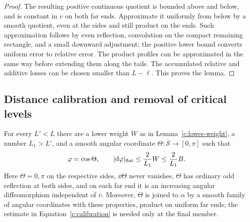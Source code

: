 \begin{proof}
The resulting positive continuous quotient is bounded above and below,
and is constant in $v$ on both far ends.  Approximate it uniformly from
below by a smooth quotient, even at the sides and still product on the
ends.  Such approximation follows by even reflection, convolution on
the compact remaining rectangle, and a small downward adjustment; the
positive lower bound converts uniform error to relative error.  The
product profiles can be approximated in the same way before extending
them along the tails.  The accumulated relative and additive losses
can be chosen smaller than $L-\ell$.  This proves the lemma.
\end{proof}

\subsection{Distance calibration and removal of critical levels}

\begin{lemma}\label{c:angular}
For every $L'<L$ there are a lower weight $W$ as in
Lemma~\ref{c:lower-weight}, a number $L_1>L'$, and a smooth angular
coordinate $\Theta:\overline{\mathcal S}\to[0,\pi]$ such that
\begin{equation}\label{c:calibration}
 \varphi=\cos\Theta,\qquad
 \lvert\mathrm d\varphi\rvert_{\mathrm{flat}}
 \le\frac{2}{L_1}W\le\frac{2}{L_1}B.
\end{equation}
Here $\Theta=0,\pi$ on the respective sides, $\dd\Theta$ never vanishes,
$\Theta$ has ordinary odd reflection at both sides, and on each far end
it is an increasing angular diffeomorphism independent of $v$.
Moreover, $\Theta$ is joined to $\alpha$ by a smooth family of angular
coordinates with these properties, product on uniform far ends; the
estimate in Equation~\eqref{c:calibration} is needed only at the final member.
\end{lemma}

